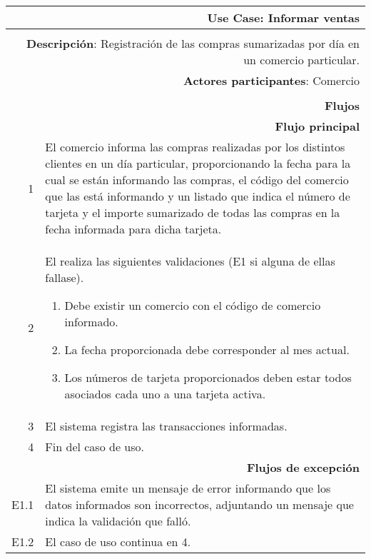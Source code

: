 \begin{tabularx}{\textwidth}{| r | X |}
\hline
\multicolumn{2}{|X|}{
\textbf{Use Case}: Informar ventas} \\

\hline
\multicolumn{2}{|c|}{\cellcolor[gray]{0.6}} \\

\hline
\multicolumn{2}{|X|}{
\textbf{Descripción}: Registración de las compras sumarizadas por día en un
comercio particular.} \\

\hline
\multicolumn{2}{|X|}{
\textbf{Actores participantes}: Comercio} \\

\hline
\multicolumn{2}{|c|}{\cellcolor[gray]{0.6} } \\

\hline
\multicolumn{2}{|X|}{
\textbf{Flujos}} \\

\hline
\multicolumn{2}{|X|}{
\textbf{Flujo principal}} \\

\hline
1 & El comercio informa las compras realizadas por los distintos clientes en un
día particular, proporcionando la fecha para la cual se están informando las
compras, el código del comercio que las está informando y un listado que indica
el número de tarjeta y el importe sumarizado de todas las compras en la fecha
informada para dicha tarjeta.\\
\hline
2 & El realiza las siguientes validaciones (E1 si alguna de ellas fallase). 
\begin{enumerate}
\item Debe existir un comercio con el código de comercio informado.
\item La fecha proporcionada debe corresponder al mes actual.
\item Los números de tarjeta proporcionados deben estar todos asociados cada
uno a una tarjeta activa.
\end{enumerate}
\\
\hline
3 & El sistema registra las transacciones informadas. \\
\hline
4 & Fin del caso de uso. \\

\hline
\multicolumn{2}{|X|}{
\textbf{Flujos de excepción}} \\

\hline
E1.1 & El sistema emite un mensaje de error informando que los datos informados
son incorrectos, adjuntando un mensaje que indica la validación que falló. \\
\hline
E1.2 & El caso de uso continua en 4. \\

\hline
\end{tabularx}

